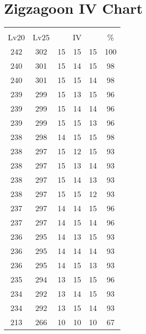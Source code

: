 \documentclass{article}%
\begin{document}
%
\normalsize%
\section{Zigzagoon IV Chart}%
\label{sec:Zigzagoon IV Chart}%
\renewcommand{\arraystretch}{1.5}%
\begin{tabular}{|c|c|c|c|c|c|}%
\hline%
\multicolumn{6}{|c|}{\textcolor{white}{ 
\linebreak{Zigzagoon}
}%
\cellcolor{black}}\\%
\multicolumn{1}{|c}{Lv20}&\multicolumn{1}{c|}{Lv25}&\multicolumn{3}{c|}{IV}&\multicolumn{1}{|c|}{\%}\\%
\hline%
\rowcolor{color100}%
242&302&15&15&15&100\\%
\hline%
\rowcolor{color98}%
240&301&15&14&15&98\\%
\hline%
\rowcolor{color98}%
240&301&15&15&14&98\\%
\hline%
\rowcolor{color96}%
239&299&15&13&15&96\\%
\hline%
\rowcolor{color96}%
239&299&15&14&14&96\\%
\hline%
\rowcolor{color96}%
239&299&15&15&13&96\\%
\hline%
\rowcolor{color98}%
238&298&14&15&15&98\\%
\hline%
\rowcolor{color93}%
238&297&15&12&15&93\\%
\hline%
\rowcolor{color93}%
238&297&15&13&14&93\\%
\hline%
\rowcolor{color93}%
238&297&15&14&13&93\\%
\hline%
\rowcolor{color93}%
238&297&15&15&12&93\\%
\hline%
\rowcolor{color96}%
237&297&14&14&15&96\\%
\hline%
\rowcolor{color96}%
237&297&14&15&14&96\\%
\hline%
\rowcolor{color93}%
236&295&14&13&15&93\\%
\hline%
\rowcolor{color93}%
236&295&14&14&14&93\\%
\hline%
\rowcolor{color93}%
236&295&14&15&13&93\\%
\hline%
\rowcolor{color96}%
235&294&13&15&15&96\\%
\hline%
\rowcolor{color93}%
234&292&13&14&15&93\\%
\hline%
\rowcolor{color93}%
234&292&13&15&14&93\\%
\hline%
\rowcolor{color91}%
213&266&10&10&10&67\\%
\end{tabular}

%
\end{document}
